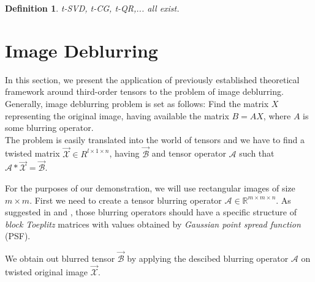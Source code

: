 \documentclass[twoside]{article}
\newtheorem{defn}{Definition}
\begin{document}
\begin{multicols}{2}
\begin{defn} t-SVD, t-CG, t-QR,... all exist.
\end{defn}


\section{Image Deblurring}
In this section, we present the application of previously established theoretical framework around third-order tensors to the problem of image deblurring.\\
Generally, image deblurring problem is set as follows: Find the matrix $X$ representing the original image, having available the matrix $B = A X$, where $A$ is some blurring operator.\\
The problem is easily translated into the world of tensors and we have to find a twisted matrix $\overrightarrow{\mathcal{X}} \in R^{l \times 1 \times n}$, having $\overrightarrow{\mathcal{B}}$ and tensor operator $\mathcal{A}$ such that $\mathcal{A} \ast \overrightarrow{\mathcal{X}} = \overrightarrow{\mathcal{B}}$.

For the purposes of our demonstration, we will use rectangular images of size $m \times m$. First we need to create a tensor blurring operator $\mathcal{A} \in \mathbb{R}^{m \times m \times n}$. As suggested in \cite{kilmer-braman-hao} and \cite{kilmer-martin}, those blurring operators should have a specific structure of \textit{block Toeplitz} matrices with values obtained by \textit{Gaussian point spread function} (PSF).

We obtain out blurred tensor $\overrightarrow{\mathcal{B}}$ by applying the descibed blurring operator $\mathcal{A}$ on twisted original image $\overrightarrow{\mathcal{X}}$.


\end{multicols}
\end{document}
